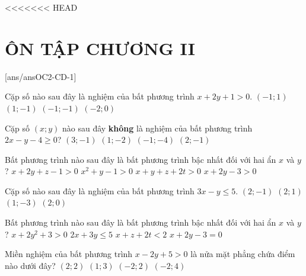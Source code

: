 <<<<<<< HEAD
\section*{ÔN TẬP CHƯƠNG II}
\setcounter{ex}{0}\setcounter{bt}{0}
[ans/ansOC2-CD-1]

\begin{ex}%
    Cặp số nào sau đây là nghiệm của bất phương trình $x+2y+1>0$.
    \choice
    {\True $(-1; 1)$}
    {$(1; -1)$}
    {$(-1; -1)$}
    {$(-2; 0)$}
\end{ex}
\begin{ex}%
    Cặp số $(x;y)$ nào sau đây \textbf{không} là nghiệm của bất phương trình $2x-y-4 \geq 0$?
    \choice
    {$(3;-1)$}
    {$(1;-2)$}
    {\True $(-1;-4)$}
    {$(2;-1)$}
\end{ex}
\begin{ex}%
    Bất phương trình nào sau đây là bất phương trình bậc nhất đối với hai ẩn $x$ và $y$?
    \choice
    {$x+2y+z-1>0$}
    {$x^2+y-1>0$}
    {$x+y+z+2t>0$}
    {\True $x+2y-3>0$}
\end{ex}
\begin{ex}%
    Cặp số nào sau đây là nghiệm của bất phương trình $3x-y \leq 5$.
    \choice
    {$(2;-1)$}
    {\True $(2; 1)$}
    {$(1; -3)$}
    {$(2; 0)$}
\end{ex}
\begin{ex}%
    Bất phương trình nào sau đây là bất phương trình bậc nhất đối với hai ẩn $x$ và $y$?
    \choice
    {$x+2y^2+3>0$}
    {\True $2x+3y \leq 5$}
    {$x+z+2t<2$}
    {$x+2y-3=0$}
\end{ex}
\begin{ex}%
    Miền nghiệm của bất phương trình $x-2y+5>0$ là nửa mặt phẳng chứa điểm nào dưới đây?
    \choice
    {\True $(2;2)$}
    {$(1;3)$}
    {$(-2;2)$}
    {$(-2;4)$}
\end{ex}
